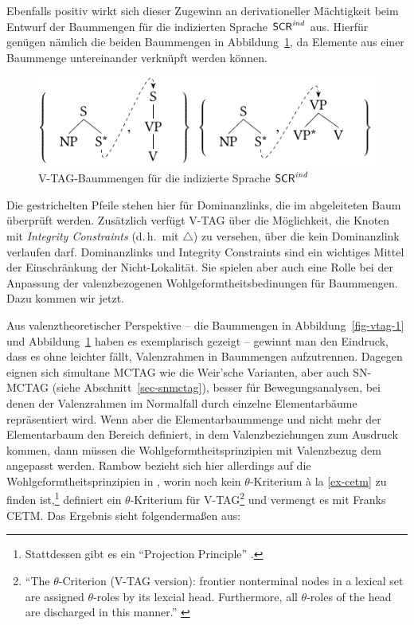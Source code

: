 Ebenfalls positiv wirkt sich dieser Zugewinn an derivationeller Mächtigkeit beim Entwurf der Baummengen für die indizierten Sprache $\mathsf{SCR}^{\mathit{ind}}$ aus. Hierfür genügen nämlich die beiden Baummengen in Abbildung~\ref{fig-vtag-2}, da Elemente aus einer Baummenge untereinander verknüpft werden können.  
\begin{figure} 
\centering
\includegraphics{graphics/abb67.pdf}
\caption{V-TAG-Baummengen für die indizierte Sprache $\mathsf{SCR}^{\mathit{ind}}$\label{fig-vtag-2}}
\end{figure}
Die gestrichelten Pfeile stehen hier für Dominanzlinks, die im abgeleiteten Baum überprüft werden. Zusätzlich verfügt V-TAG über die Möglichkeit, die Knoten mit {\it Integrity Constraints} (d.\,h.\ mit $\bigtriangleup$) zu versehen, über die kein Dominanzlink verlaufen darf. Dominanzlinks und Integrity Constraints sind ein wichtiges Mittel der Einschränkung der Nicht-Lokalität. Sie spielen aber auch eine Rolle bei der Anpassung der valenzbezogenen Wohlgeformtheitsbedinungen für Baummengen. Dazu kommen wir jetzt. 

Aus valenztheoretischer Perspektive -- die Baummengen in Abbildung~\ref{fig-vtag-1} und Abbildung~\ref{fig-vtag-2} haben es exemplarisch gezeigt -- gewinnt man den Eindruck, dass es ohne  leichter fällt, Valenzrahmen in Baummengen aufzutrennen. Dagegen eignen sich simultane MCTAG wie die Weir'sche Varianten, aber auch SN-MCTAG (siehe Abschnitt~\ref{sec-snmctag}), besser für Bewegungsanalysen, bei denen der Valenzrahmen im Normalfall durch einzelne Elementarbäume repräsentiert wird. Wenn aber die Elementarbaummenge und nicht mehr der Elementarbaum den Bereich definiert, in dem Valenzbeziehungen zum Ausdruck kommen, dann müssen die Wohlgeformtheitsprinzipien mit Valenzbezug dem angepasst werden. Rambow bezieht sich hier allerdings auf die Wohlgeformtheitsprinzipien in \cite{Frank:92}, worin noch kein $\theta$-Kriterium \`a la \ref{ex-cetm} zu finden ist,\footnote{Stattdessen gibt es ein "`Projection Principle"' \citep[56]{Frank:92}.} definiert ein $\theta$-Kriterium für V-TAG\footnote{"`The $\theta$-Criterion (V-TAG version): frontier nonterminal nodes in a lexical set are assigned $\theta$-roles by its lexcial head. Furthermore, all $\theta$-roles of the head are discharged in this manner."' \citep[148]{Rambow:94}} und vermengt es mit Franks CETM. Das Ergebnis sieht folgenderma\ss en aus:
    
